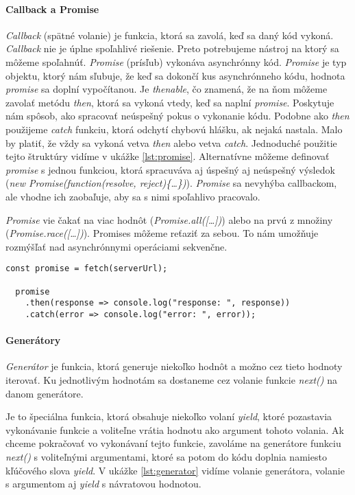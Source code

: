 \paragraph{Callback a Promise}%
\emph{Callback} (spätné volanie) je funkcia, ktorá sa zavolá, keď sa daný kód vykoná. \emph{Callback} nie je úplne spoľahlivé riešenie. Preto potrebujeme nástroj na ktorý sa môžeme spoľahnúť. 
\emph{Promise} (prísľub) vykonáva asynchrónny kód. 
\emph{Promise} je typ objektu, ktorý nám sľubuje, že keď sa dokončí kus asynchrónneho kódu, hodnota \emph{promise} sa doplní vypočítanou. 
Je \emph{thenable}, čo znamená, že na ňom môžeme zavolať metódu \emph{then}, ktorá sa vykoná vtedy, keď sa naplní \emph{promise}. Poskytuje nám spôsob, ako spracovať neúspešný pokus o vykonanie kódu. 
Podobne ako \emph{then} použijeme \emph{catch} funkciu, ktorá odchytí chybovú hlášku, ak nejaká nastala. Malo by platiť, že vždy sa vykoná vetva \emph{then} alebo vetva \emph{catch}. Jednoduché použitie tejto štruktúry vidíme v ukážke \ref{lst:promise}.
Alternatívne môžeme definovať \emph{promise} s jednou funkciou, ktorá spracuváva aj úspešný aj neúspešný výsledok (\emph{new Promise(function(resolve, reject)\{\ldots\})}).
\emph{Promise} sa nevyhýba callbackom, ale vhodne ich zaobaľuje, aby sa s nimi spoľahlivo pracovalo.

\emph{Promise} vie čakať na viac hodnôt (\emph{Promise.all([\ldots])})
alebo na prvú z množiny (\emph{Promise.race([\ldots])}).
Promises môžeme reťaziť za sebou. To nám umožňuje rozmýšľať nad asynchrónnymi operáciami sekvenčne.

\begin{lstlisting}[caption=Promise, label={lst:promise}]
  const promise = fetch(serverUrl);

  promise
    .then(response => console.log("response: ", response))
    .catch(error => console.log("error: ", error));
\end{lstlisting}

\paragraph{Generátory}
\emph{Generátor} je funkcia, ktorá generuje niekoľko hodnôt a možno cez tieto hodnoty iterovať. Ku jednotlivým hodnotám sa dostaneme cez volanie funkcie \emph{next()} na danom generátore. 

Je to špeciálna funkcia, ktorá obsahuje niekoľko volaní \emph{yield}, ktoré pozastavia vykonávanie funkcie a voliteľne vrátia hodnotu ako argument tohoto volania. 
Ak chceme pokračovať vo vykonávaní tejto funkcie, zavoláme na generátore funkciu \emph{next()} s voliteľnými argumentami, ktoré sa potom do kódu doplnia namiesto kľúčového slova \emph{yield}.
V ukážke \ref{lst:generator} vidíme volanie generátora, volanie s argumentom aj \emph{yield} s návratovou hodnotou.

